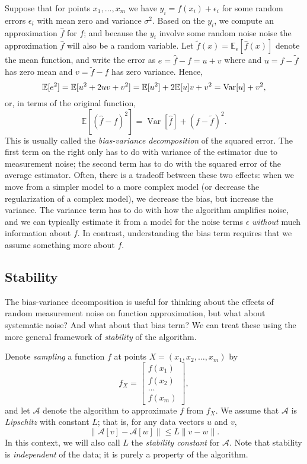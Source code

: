 \documentclass[12pt, leqno]{article} %
\begin{document}
Suppose that for points $x_1, \ldots, x_m$ we have $y_i = f(x_i) + \epsilon_i$
for some random errors $\epsilon_i$ with mean zero and variance $\sigma^2$.
Based on the $y_i$, we compute an approximation $\hat{f}$ for $f$;
and because the $y_i$ involve some random noise noise the
approximation $\hat{f}$ will also be a random variable.  Let
$\tilde{f}(x) = \mathbb{E}_{\epsilon}[\hat{f}(x)]$ denote the mean
function, and write the error as $e = \hat{f}-f = u + v$ where
and $u = \hat{f}-\tilde{f}$ has zero mean and
$v = \tilde{f}-f$ has zero variance.  Hence,
\[
  \mathbb{E}[e^2]
  = \mathbb{E}[u^2 + 2uv + v^2] \\
  = \mathbb{E}[u^2] + 2\mathbb{E}[u] v + v^2 \\
  = \operatorname{Var}[u] + v^2,
\]
or, in terms of the original function,
\[
  \mathbb{E}[(\hat{f}-f)^2] = \operatorname{Var}[\hat{f}] + (f-\tilde{f})^2.
\]
This is usually called the {\em bias-variance decomposition} of the
squared error.  The first term on the right only has to do with
variance of the estimator due to measurement noise; the second term
has to do with the squared error of the average estimator.  Often,
there is a tradeoff between these two effects: when we move from
a simpler model to a more complex model (or decrease the
regularization of a complex model), we decrease the bias, but
increase the variance.  The variance term has to do
with how the algorithm amplifies noise, and we can typically estimate
it from a model for the noise terms $\epsilon$ {\em without} much
information about $f$.  In contrast, understanding the bias term
requires that we assume something more about $f$.

\subsection{Stability}

The bias-variance decomposition is useful for thinking about the
effects of random measurement noise on function approximation, but
what about systematic noise?  And what about that bias term?
We can treat these using the more general framework of
{\em stability} of the algorithm.

Denote {\em sampling} a function $f$ at points
$X = (x_1, x_2, \ldots, x_m)$ by
\[
  f_X = \begin{bmatrix} f(x_1) \\ f(x_2) \\ \ldots \\ f(x_m) \end{bmatrix},
\]
and let $\mathcal{A}$ denote the algorithm to approximate $f$ from
$f_X$.  We assume that $\mathcal{A}$ is {\em Lipschitz} with constant
$L$; that is, for any data vectors $u$ and $v$,
\[
  \|\mathcal{A}[v]-\mathcal{A}[w]\| \leq L\|v-w\|.
\]
In this context, we will also call $L$ the {\em stability constant}
for $\mathcal{A}$.  Note that stability is {\em independent} of the
data; it is purely a property of the algorithm.
\end{document}
